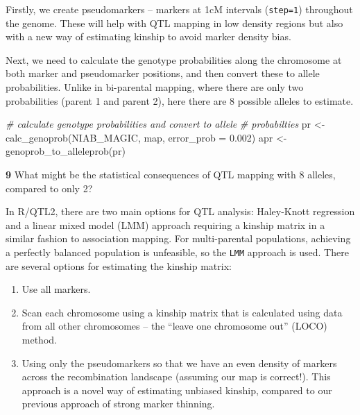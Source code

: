 \documentclass[
]{book}
\makeatletter
\newenvironment{Shaded}{\begin{snugshade}}{\end{snugshade}}
\newcommand{\AttributeTok}[1]{\textcolor[rgb]{0.77,0.63,0.00}{#1}}
\newcommand{\CommentTok}[1]{\textcolor[rgb]{0.56,0.35,0.01}{\textit{#1}}}
\newcommand{\DecValTok}[1]{\textcolor[rgb]{0.00,0.00,0.81}{#1}}
\newcommand{\FloatTok}[1]{\textcolor[rgb]{0.00,0.00,0.81}{#1}}
\newcommand{\FunctionTok}[1]{\textcolor[rgb]{0.00,0.00,0.00}{#1}}
\newcommand{\NormalTok}[1]{#1}
\newcommand{\OtherTok}[1]{\textcolor[rgb]{0.56,0.35,0.01}{#1}}
\newcommand{\SpecialCharTok}[1]{\textcolor[rgb]{0.00,0.00,0.00}{#1}}
\newenvironment{kframe}{%
\medskip{}
\setlength{\fboxsep}{.8em}
 \def\at@end@of@kframe{}%
 \ifinner\ifhmode%
  \def\at@end@of@kframe{\end{minipage}}%
  \begin{minipage}{\columnwidth}%
 \fi\fi%
 \def\FrameCommand##1{\hskip\@totalleftmargin \hskip-\fboxsep
 \colorbox{shadecolor}{##1}\hskip-\fboxsep
     \hskip-\linewidth \hskip-\@totalleftmargin \hskip\columnwidth}%
 \MakeFramed {\advance\hsize-\width
   \@totalleftmargin\z@ \linewidth\hsize
   \@setminipage}}%
 {\par\unskip\endMakeFramed%
 \at@end@of@kframe}
\newenvironment{rmdblock}[1]
  {
  \begin{itemize}
  \renewcommand{\labelitemi}{
    \raisebox{-.7\height}[0pt][0pt]{
      {\setkeys{Gin}{width=3em,keepaspectratio}\texttt{[image: images/\#1]}}
    }
  }
  \setlength{\fboxsep}{1em}
  \begin{kframe}
  \item
  }
  {
  \end{kframe}
  \end{itemize}
  }
\newenvironment{rmdquiz}
  {\begin{rmdblock}{quiz}}
  {\end{rmdblock}}
\makeatother
\begin{document}
Firstly, we create pseudomarkers -- markers at 1cM intervals (\texttt{step=1}) throughout the genome. These will help with QTL mapping in low density regions but also with a new way of estimating kinship to avoid marker density bias.

\begin{Shaded}
\end{Shaded}

Next, we need to calculate the genotype probabilities along the chromosome at both marker and pseudomarker positions, and then convert these to allele probabilities. Unlike in bi-parental mapping, where there are only two probabilities (parent 1 and parent 2), here there are 8 possible alleles to estimate.

\begin{Shaded}
\begin{Highlighting}[]
\CommentTok{\# calculate genotype probabilities and convert to allele}
\CommentTok{\# probabilties}
\NormalTok{pr }\OtherTok{\textless{}{-}} \FunctionTok{calc\_genoprob}\NormalTok{(NIAB\_MAGIC, map, }\AttributeTok{error\_prob =} \FloatTok{0.002}\NormalTok{)}
\NormalTok{apr }\OtherTok{\textless{}{-}} \FunctionTok{genoprob\_to\_alleleprob}\NormalTok{(pr)}
\end{Highlighting}
\end{Shaded}

\begin{rmdquiz}
\textbf{9}
What might be the statistical consequences of QTL mapping with 8 alleles, compared to only 2?
\end{rmdquiz}

In R/QTL2, there are two main options for QTL analysis: Haley-Knott regression and a linear mixed model (LMM) approach requiring a kinship matrix in a similar fashion to association mapping. For multi-parental populations, achieving a perfectly balanced population is unfeasible, so the \texttt{LMM} approach is used. There are several options for estimating the kinship matrix:

\begin{enumerate}
\def\labelenumi{\arabic{enumi}.}
\item
  Use all markers.
\item
  Scan each chromosome using a kinship matrix that is calculated using data from all other chromosomes -- the ``leave one chromosome out'' (LOCO) method.
\item
  Using only the pseudomarkers so that we have an even density of markers across the recombination landscape (assuming our map is correct!). This approach is a novel way of estimating unbiased kinship, compared to our previous approach of strong marker thinning.
\end{enumerate}
\end{document}

